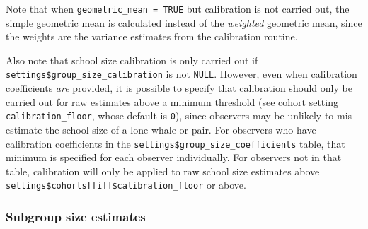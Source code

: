 \documentclass[
]{book}
\newenvironment{Shaded}{\begin{snugshade}}{\end{snugshade}}
\newcommand{\DecValTok}[1]{\textcolor[rgb]{0.00,0.00,0.81}{#1}}
\newcommand{\FloatTok}[1]{\textcolor[rgb]{0.00,0.00,0.81}{#1}}
\newcommand{\KeywordTok}[1]{\textcolor[rgb]{0.13,0.29,0.53}{\textbf{#1}}}
\newcommand{\NormalTok}[1]{#1}
\newcommand{\OperatorTok}[1]{\textcolor[rgb]{0.81,0.36,0.00}{\textbf{#1}}}
\newcommand{\StringTok}[1]{\textcolor[rgb]{0.31,0.60,0.02}{#1}}
\begin{document}
\begin{Shaded}
\end{Shaded}

Note that when \texttt{geometric\_mean\ =\ TRUE} but calibration is not carried out, the simple geometric mean is calculated instead of the \emph{weighted} geometric mean, since the weights are the variance estimates from the calibration routine.

Also note that school size calibration is only carried out if \texttt{settings\$group\_size\_calibration} is not \texttt{NULL}. However, even when calibration coefficients \emph{are} provided, it is possible to specify that calibration should only be carried out for raw estimates above a minimum threshold (see cohort setting \texttt{calibration\_floor}, whose default is \texttt{0}), since observers may be unlikely to mis-estimate the school size of a lone whale or pair. For observers who have calibration coefficients in the \texttt{settings\$group\_size\_coefficients} table, that minimum is specified for each observer individually. For observers not in that table, calibration will only be applied to raw school size estimates above \texttt{settings\$cohorts{[}{[}i{]}{]}\$calibration\_floor} or above.

\hypertarget{subgroups}{%
\subsubsection*{Subgroup size estimates}\label{subgroups}}
\end{document}

